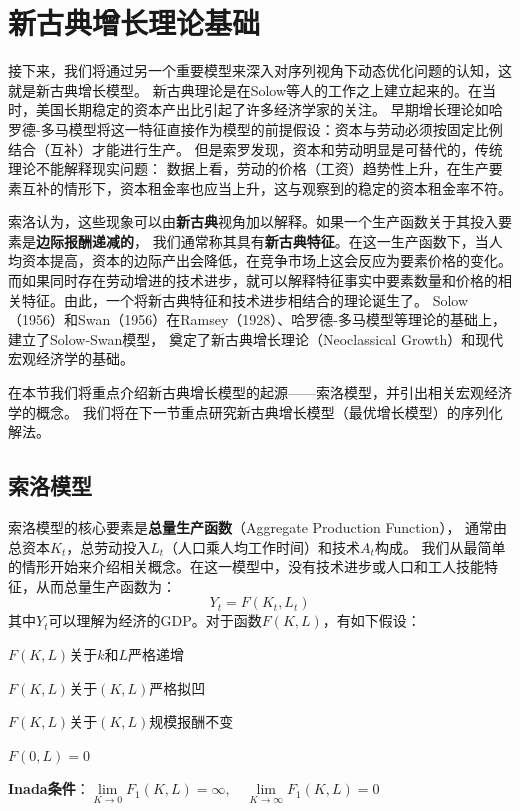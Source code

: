 
\section{新古典增长理论基础} \label{sec-ngm}

接下来，我们将通过另一个重要模型来深入对序列视角下动态优化问题的认知，这就是新古典增长模型。
新古典理论是在Solow等人的工作之上建立起来的。在当时，美国长期稳定的资本产出比引起了许多经济学家的关注。
早期增长理论如哈罗德-多马模型将这一特征直接作为模型的前提假设：资本与劳动必须按固定比例结合（互补）才能进行生产。
但是索罗发现，资本和劳动明显是可替代的，传统理论不能解释现实问题：
数据上看，劳动的价格（工资）趋势性上升，在生产要素互补的情形下，资本租金率也应当上升，这与观察到的稳定的资本租金率不符。

索洛认为，这些现象可以由\textbf{新古典}视角加以解释。如果一个生产函数关于其投入要素是\textbf{边际报酬递减的}，
我们通常称其具有\textbf{新古典特征}。在这一生产函数下，当人均资本提高，资本的边际产出会降低，在竞争市场上这会反应为要素价格的变化。
而如果同时存在劳动增进的技术进步，就可以解释特征事实中要素数量和价格的相关特征。由此，一个将新古典特征和技术进步相结合的理论诞生了。
Solow（1956）和Swan（1956）在Ramsey（1928）、哈罗德-多马模型等理论的基础上，建立了Solow-Swan模型，
奠定了新古典增长理论（Neoclassical Growth）和现代宏观经济学的基础。

在本节我们将重点介绍新古典增长模型的起源——索洛模型，并引出相关宏观经济学的概念。
我们将在下一节重点研究新古典增长模型（最优增长模型）的序列化解法。


\subsection{索洛模型}

索洛模型的核心要素是\textbf{总量生产函数}（Aggregate Production Function），
通常由总资本$K_t$，总劳动投入$L_t$（人口乘人均工作时间）和技术$A_t$构成。
我们从最简单的情形开始来介绍相关概念。在这一模型中，没有技术进步或人口和工人技能特征，从而总量生产函数为：
\begin{equation*}
    Y_t = F\left(K_t, L_t\right)
\end{equation*}
其中$Y_t$可以理解为经济的GDP。对于函数$F(K, L)$，有如下假设：
\begin{assumption}  \label{as-F-increase}
    $F(K, L)$关于$k$和$L$严格递增
\end{assumption}
\begin{assumption}  \label{as-F-quasiconcave}
    $F(K, L)$关于$(K, L)$严格拟凹
\end{assumption}
\begin{assumption}  \label{as-F-cosntant}
    $F(K, L)$关于$(K, L)$规模报酬不变
\end{assumption}
\begin{assumption}  \label{as-F-zero}
    $F(0, L)=0$
\end{assumption}
\begin{assumption}  \label{as-F-inada}
    \textbf{Inada条件}：$\lim\limits_{K\rightarrow 0}F_1(K, L)
        = \infty, \quad \lim\limits_{K\rightarrow \infty}F_1(K, L)=0$
\end{assumption}

